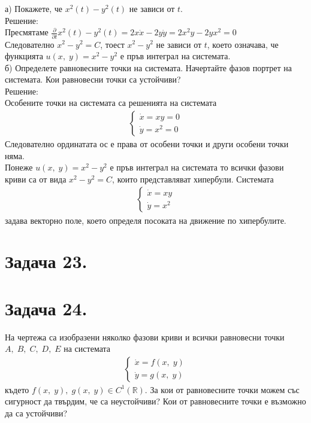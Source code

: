 \documentclass[a4paper, 12pt, oneside]{article}
\newcommand{\R}{\mathbb{R}}
\begin{document}
а) Покажете, че $x^2(t) - y^2(t)$ не зависи от $t$. \\

Решение: \\

Пресмятаме $\displaystyle\frac{\partial}{\partial t} x^2(t) - y^2(t) = 2x\dot{x} - 2y\dot{y} = 2x^2y - 2yx^2 = 0$ \\

Следователно $x^2 - y^2 = C$, тоест $x^2 - y^2$ не зависи от $t$, което
означава, че функцията $u(x, \; y) = x^2 - y^2$ е пръв интеграл на системата. \\

б) Определете равновесните точки на системата. Начертайте фазов портрет на системата.
Кои равновесни точки са устойчиви? \\

Решение: \\

Особените точки на системата са решенията на системата
\begin{align*}
    \begin{cases}
        \dot{x} = xy = 0 \\
        \dot{y} = x^2 = 0
    \end{cases}
\end{align*}
Следователно ординатата ос е права от особени точки и други особени точки няма. \\

Понеже $u(x, \; y) = x^2 - y^2$ е пръв интеграл на системата то всички фазови криви са от вида
$x^2 - y^2 = C$, които представляват хипербули. Системата
\begin{align*}
    \begin{cases}
        \dot{x} = xy \\
        \dot{y} = x^2
    \end{cases}
\end{align*}
задава векторно поле, което определя посоката на движение по хипербулите.

\section{Задача 23.}

\section{Задача 24.}
На чертежа са изобразени няколко фазови криви и всички
равновесни точки $A, \; B, \; C, \; D, \; E$ на системата
\begin{align*}
    \begin{cases}
        \dot{x} = f(x, \; y) \\
        \dot{y} = g(x, \; y)
    \end{cases}
\end{align*}
където $f(x, \; y), \; g(x, \; y) \in C^1(\R)$.
За кои от равновесните точки можем със сигурност
да твърдим, че са неустойчиви? Кои от равновесните
точки е възможно да са устойчиви? \\
\end{document}
